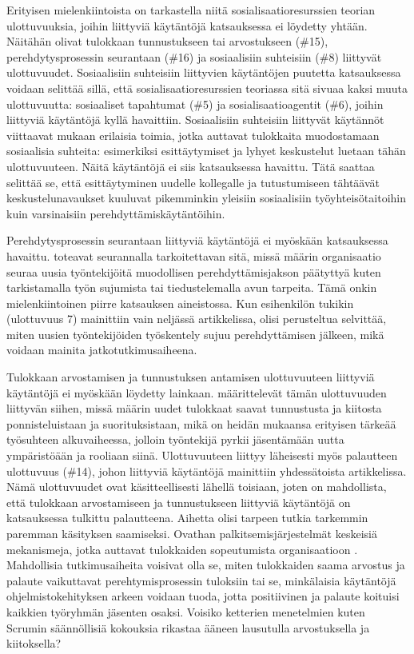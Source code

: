\documentclass[utf8]{gradu3}
\begin{document}
Erityisen mielenkiintoista on tarkastella niitä sosialisaatioresurssien teorian ulottuvuuksia, joihin liittyviä käytäntöjä katsauksessa ei löydetty yhtään. Näitähän olivat tulokkaan tunnustukseen tai arvostukseen (\#15), perehdytysprosessin seurantaan (\#16) ja sosiaalisiin suhteisiin (\#8) liittyvät ulottuvuudet. Sosiaalisiin suhteisiin liittyvien käytäntöjen puutetta katsauksessa voidaan selittää sillä, että sosialisaatioresurssien teoriassa sitä sivuaa kaksi muuta ulottuvuutta: sosiaaliset tapahtumat (\#5) ja sosialisaatioagentit (\#6), joihin liittyviä käytäntöjä kyllä havaittiin. Sosiaalisiin suhteisiin liittyvät käytännöt viittaavat \textcite{wanberg-2012} mukaan erilaisia toimia, jotka auttavat tulokkaita muodostamaan sosiaalisia suhteita: esimerkiksi esittäytymiset ja lyhyet keskustelut luetaan tähän ulottuvuuteen. Näitä käytäntöjä ei siis katsauksessa havaittu. Tätä saattaa selittää se, että esittäytyminen uudelle kollegalle ja tutustumiseen tähtäävät keskustelunavaukset kuuluvat pikemminkin yleisiin sosiaalisiin työyhteisötaitoihin kuin varsinaisiin perehdyttämiskäytäntöihin. 

Perehdytysprosessin seurantaan liittyviä käytäntöjä ei myöskään katsauksessa havaittu. \textcite{wanberg-2012} toteavat seurannalla tarkoitettavan sitä, missä määrin organisaatio seuraa uusia työntekijöitä muodollisen perehdyttämisjakson päätyttyä kuten tarkistamalla työn sujumista tai tiedustelemalla avun tarpeita. Tämä onkin mielenkiintoinen piirre katsauksen aineistossa. Kun esihenkilön tukikin (ulottuvuus 7) mainittiin vain neljässä artikkelissa, olisi perusteltua selvittää, miten uusien työntekijöiden työskentely sujuu perehdyttämisen jälkeen, mikä voidaan mainita jatkotutkimusaiheena.

Tulokkaan arvostamisen ja tunnustuksen antamisen ulottuvuuteen liittyviä käytäntöjä ei myöskään löydetty lainkaan. \textcite{wanberg-2012} määrittelevät tämän ulottuvuuden liittyvän siihen, missä määrin uudet tulokkaat saavat tunnustusta ja kiitosta ponnisteluistaan ja suorituksistaan, mikä on heidän mukaansa erityisen tärkeää työsuhteen alkuvaiheessa, jolloin työntekijä pyrkii jäsentämään uutta ympäristöään ja rooliaan siinä. Ulottuvuuteen liittyy läheisesti myös palautteen ulottuvuus (\#14), johon liittyviä käytäntöjä mainittiin yhdessätoista artikkelissa. Nämä ulottuvuudet ovat käsitteellisesti lähellä toisiaan, joten on mahdollista, että tulokkaan arvostamiseen ja tunnustukseen liittyviä käytäntöjä on katsauksessa tulkittu palautteena. Aihetta olisi tarpeen tutkia tarkemmin paremman käsityksen saamiseksi. Ovathan palkitsemisjärjestelmät keskeisiä mekanismeja, jotka auttavat tulokkaiden sopeutumista organisaatioon \parencite{jokisaari-nurmi-2009}. Mahdollisia tutkimusaiheita voisivat olla se, miten tulokkaiden saama arvostus ja palaute vaikuttavat perehtymisprosessin tuloksiin tai se, minkälaisia käytäntöjä ohjelmistokehityksen arkeen voidaan tuoda, jotta positiivinen ja palaute koituisi kaikkien työryhmän jäsenten osaksi. Voisiko ketterien menetelmien kuten Scrumin säännöllisiä kokouksia rikastaa ääneen lausutulla arvostuksella ja kiitoksella?
\end{document}
